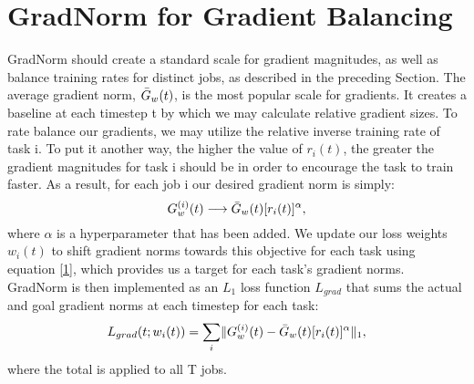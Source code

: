\documentclass{article}
\begin{document}
\section{GradNorm for Gradient Balancing}
GradNorm should create a standard scale for gradient magnitudes, as well as balance training rates for distinct jobs, as described in the preceding Section. The average gradient norm, $\Bar{G}_w(t)$, is the most popular scale for gradients. It creates a baseline at each timestep t by which we may calculate relative gradient sizes. To rate balance our gradients, we may utilize the relative inverse training rate of task i. To put it another way, the higher the value of $r_i(t)$, the greater the gradient magnitudes for task i should be in order to encourage the task to train faster. As a result, for each job i our desired gradient norm is simply:
\begin{equation}
\label{1}
    G^{(i)}_w(t) \longrightarrow \Bar{G}_w(t) [r_i(t)]^\alpha,
\end{equation}
where $\alpha$ is a hyperparameter that has been added.  We update our loss weights $w_i(t)$ to shift gradient norms towards this objective for each task using equation \ref{1}, which provides us a target for each task's gradient norms. GradNorm is then implemented as an $L_1$ loss function $L_{grad}$ that sums the actual and goal gradient norms at each timestep for each task:
\begin{equation}
\label{2}
   L_{grad}(t; w_i(t)) =  \sum_i\lVert G^{(i)}_w(t) - \Bar{G}_w(t) [r_i(t)]^\alpha\lVert_1,
\end{equation}
where the total is applied to all T jobs.
\end{document}
